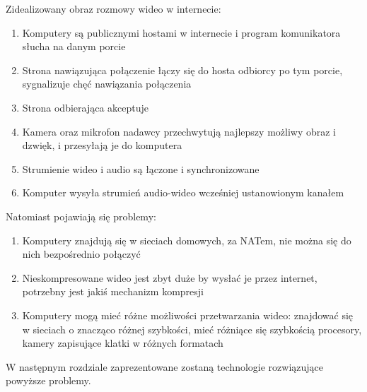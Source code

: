 Zidealizowany obraz rozmowy wideo w internecie:
\begin{enumerate}
	\item Komputery są publicznymi hostami w internecie i program komunikatora słucha na danym porcie
	\item Strona nawiązująca połączenie łączy się do hosta odbiorcy po tym porcie, sygnalizuje chęć
	      nawiązania połączenia
	\item Strona odbierająca akceptuje
	\item Kamera oraz mikrofon nadawcy przechwytują najlepszy możliwy obraz i dzwięk, i przesyłają
	      je do komputera
	\item Strumienie wideo i audio są łączone i synchronizowane
	\item Komputer wysyła strumień audio-wideo wcześniej ustanowionym kanałem
\end{enumerate}

Natomiast pojawiają się problemy:

\begin{enumerate}
	\item Komputery znajdują się w sieciach domowych, za NATem, nie można się do nich bezpośrednio
	      połączyć
	\item Nieskompresowane wideo jest zbyt duże by wysłać je przez internet, potrzebny jest jakiś
	      mechanizm kompresji
	\item Komputery mogą mieć różne możliwości przetwarzania wideo: znajdować się w sieciach o
	      znacząco różnej szybkości, mieć różniące się szybkością procesory, kamery zapisujące
	      klatki w różnych formatach
\end{enumerate}

W następnym rozdziale zaprezentowane zostaną technologie rozwiązujące powyższe problemy.
